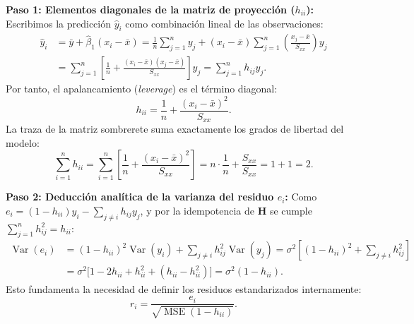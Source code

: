 \documentclass[11pt,a4paper]{article}
\begin{document}
\begin{demobox}
\textbf{Paso 1: Elementos diagonales de la matriz de proyección ($h_{ii}$):}  
Escribimos la predicción $\hat{y}_i$ como combinación lineal de las observaciones:
\begin{align}
\hat{y}_i &= \bar{y} + \hat{\beta}_1(x_i - \bar{x}) = \frac{1}{n}\sum_{j=1}^n y_j + (x_i - \bar{x})\sum_{j=1}^n \left(\frac{x_j - \bar{x}}{S_{xx}}\right)y_j \\
&= \sum_{j=1}^n \left[ \frac{1}{n} + \frac{(x_i - \bar{x})(x_j - \bar{x})}{S_{xx}} \right] y_j = \sum_{j=1}^n h_{ij} y_j.
\end{align}
Por tanto, el apalancamiento (\emph{leverage}) es el término diagonal:
\begin{equation}
h_{ii} = \frac{1}{n} + \frac{(x_i - \bar{x})^2}{S_{xx}}.
\end{equation}
La traza de la matriz sombrerete suma exactamente los grados de libertad del modelo:
\begin{equation}
\sum_{i=1}^n h_{ii} = \sum_{i=1}^n \left[ \frac{1}{n} + \frac{(x_i - \bar{x})^2}{S_{xx}} \right] = n \cdot \frac{1}{n} + \frac{S_{xx}}{S_{xx}} = 1 + 1 = 2.
\end{equation}

\textbf{Paso 2: Deducción analítica de la varianza del residuo $e_i$:}  
Como $e_i = (1 - h_{ii})y_i - \sum_{j \neq i} h_{ij} y_j$, y por la idempotencia de $\mathbf{H}$ se cumple $\sum_{j=1}^n h_{ij}^2 = h_{ii}$:
\begin{align}
\operatorname{Var}(e_i) &= (1 - h_{ii})^2 \operatorname{Var}(y_i) + \sum_{j \neq i} h_{ij}^2 \operatorname{Var}(y_j) = \sigma^2 \left[ (1 - h_{ii})^2 + \sum_{j \neq i} h_{ij}^2 \right] \\
&= \sigma^2 \big[ 1 - 2h_{ii} + h_{ii}^2 + (h_{ii} - h_{ii}^2) \big] = \sigma^2 (1 - h_{ii}).
\end{align}
Esto fundamenta la necesidad de definir los residuos estandarizados internamente:
\begin{equation}
r_i = \frac{e_i}{\sqrt{\operatorname{MSE}(1 - h_{ii})}}.
\end{equation}


\end{demobox}
\end{document}
